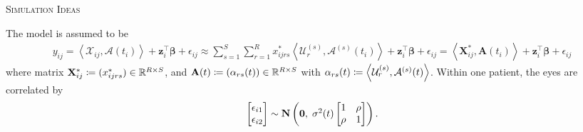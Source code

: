 \documentclass[10pt]{notes}
\begin{document}
\thispagestyle{firstpage}
\begin{center}
    \large\textsc{Simulation Ideas}
\end{center}

The model is assumed to be
\begin{align}
\label{eq-model0}
y_{ij}
= \left\langle \mathcal{X}_{ij}, \mathcal{A}(t_i) \right\rangle
+ \mathbf{z}_i^\top \boldsymbol{\beta} + \epsilon_{ij}
\approx \sum_{s=1}^S \sum_{r=1}^R
   x_{ijrs}^{*}
   \left\langle
   \mathcal{U}_r^{(s)},
   \mathcal{A}^{(s)}(t_i)
   \right\rangle
   + \mathbf{z}_i^\top \boldsymbol{\beta}
   + \epsilon_{ij} 
= \left\langle \mathbf{X}_{ij}^{*}, \mathbf{A}(t_i) \right\rangle
   + \mathbf{z}_i^\top \boldsymbol{\beta}
   + \epsilon_{ij}
\end{align}
where matrix $\mathbf{X}_{ij}^{*}\coloneq(x_{ijrs}^*)\in\mathbb{R}^{R\times S}$, and $\mathbf{A}(t)\coloneq (\alpha_{rs}(t))\in\mathbb{R}^{R\times S}$ with $\alpha_{rs}(t)\coloneq \left\langle \mathcal{U}_r^{(s)}, \mathcal{A}^{(s)}(t) \right\rangle$. Within one patient, the eyes are correlated by
\begin{align*}
    \begin{bmatrix}
        \epsilon_{i1}\\ \epsilon_{i2}
    \end{bmatrix}\sim 
    \bm{\mathrm{N}}\begin{pmatrix}
        \mathbf{0},\; \sigma^2(t)\begin{bmatrix}
            1 & \rho\\ 
            \rho & 1
        \end{bmatrix}
    \end{pmatrix}.
\end{align*}
\end{document}
